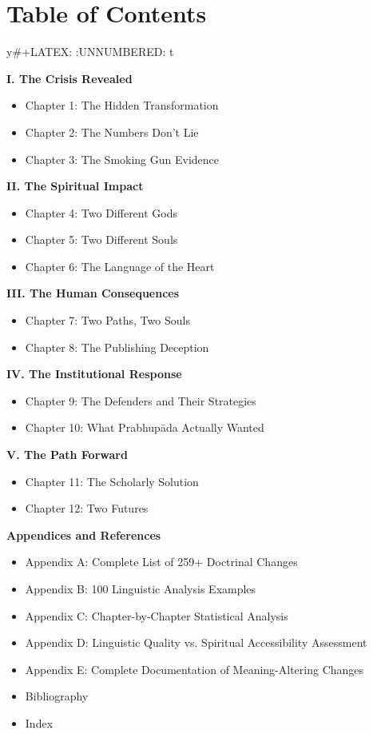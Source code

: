 \documentclass[11pt,twoside]{book}
\begin{document}
\chapter*{Table of Contents}
\label{sec:org732e38b}
y\#+LATEX: \thispagestyle{empty}
:UNNUMBERED: t

\textbf{I.  The Crisis Revealed}
\begin{itemize}
\item Chapter 1: The Hidden Transformation
\item Chapter 2: The Numbers Don't Lie
\item Chapter 3: The Smoking Gun Evidence
\end{itemize}

\textbf{II.  The Spiritual Impact}
\begin{itemize}
\item Chapter 4: Two Different Gods
\item Chapter 5: Two Different Souls
\item Chapter 6: The Language of the Heart
\end{itemize}

\textbf{III.  The Human Consequences}
\begin{itemize}
\item Chapter 7: Two Paths, Two Souls
\item Chapter 8: The Publishing Deception
\end{itemize}

\textbf{IV.  The Institutional Response}
\begin{itemize}
\item Chapter 9: The Defenders and Their Strategies
\item Chapter 10: What Prabhupāda Actually Wanted
\end{itemize}

\newpage
\thispagestyle{empty}

\textbf{V.  The Path Forward}
\begin{itemize}
\item Chapter 11: The Scholarly Solution
\item Chapter 12: Two Futures
\end{itemize}

\textbf{Appendices and References}
\begin{itemize}
\item Appendix A: Complete List of 259+ Doctrinal Changes
\item Appendix B: 100 Linguistic Analysis Examples
\item Appendix C: Chapter-by-Chapter Statistical Analysis
\item Appendix D: Linguistic Quality vs. Spiritual Accessibility Assessment
\item Appendix E: Complete Documentation of Meaning-Altering Changes
\item Bibliography
\item Index
\end{itemize}
\end{document}
